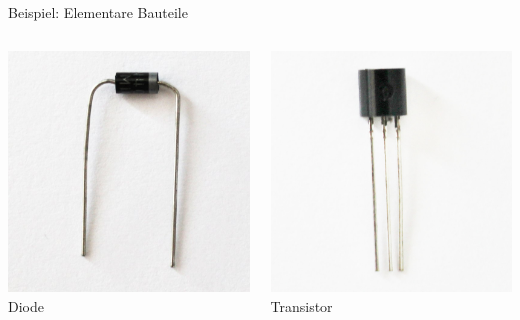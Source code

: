 {\begin{frame}{Beispiel: Elementare Bauteile}
\begin{columns}
        \includegraphics[width=.8\textwidth]{2-hardwaredesign/img/komponenten_elementar_diode} \\
        Diode

        \includegraphics[width=.8\textwidth]{2-hardwaredesign/img/komponenten_elementar_transistor} \\
        Transistor
    \end{columns}

    \bigskip


\end{frame}}

